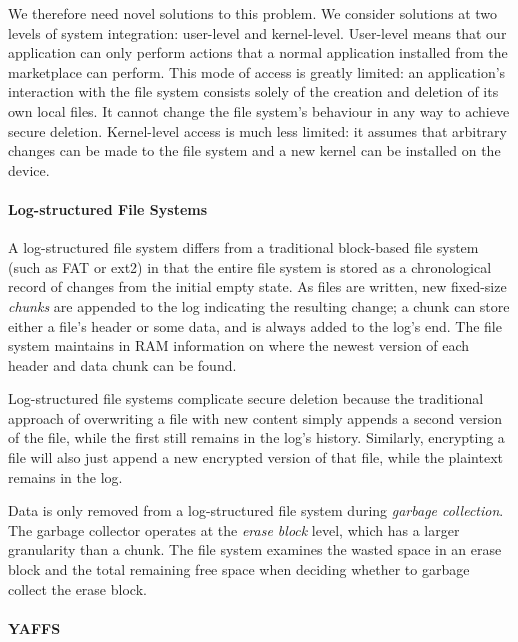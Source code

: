 \documentclass{acmtog}
\begin{document}
We therefore need novel solutions to this problem. We consider solutions at two
levels of system integration: 
user-level and kernel-level. User-level means that our
application can only perform actions that a normal application installed from
the marketplace can perform. This mode of access is greatly limited: an
application's interaction with the file system consists solely of the creation
and deletion of its own local files. It cannot change the file system's behaviour 
in any
way to achieve secure deletion. Kernel-level access is much less
limited: it assumes that arbitrary changes can be made to the file system and a new
kernel can be installed on the device.



\paragraph{Log-structured File Systems}
A log-structured file system differs from a traditional block-based
file system (such as FAT or ext2) in that the entire file system is stored as a chronological record
of changes from the initial empty state.  As files are written, new fixed-size
\emph{chunks} are
appended to the log indicating the resulting change; a chunk can store either
a file's header or some  data, and is always added to the log's end. 
The file system maintains in RAM information on where the newest version of
each header and data chunk can be found.

Log-structured file systems complicate secure deletion because the
traditional approach of overwriting a file with new content simply
appends a second version of the file, while the first still remains in the
log's history. Similarly,
encrypting a file will also just append a new encrypted version of that
file, while the plaintext remains in the log.

Data is only removed from a log-structured file system
during \emph{garbage collection}. The garbage collector operates at the \emph{erase block}
level, which has a  larger granularity than a chunk.
The file system examines the wasted space in an erase block and
the total remaining free space when deciding whether to
garbage collect the erase block.

\paragraph{YAFFS}
\end{document}
